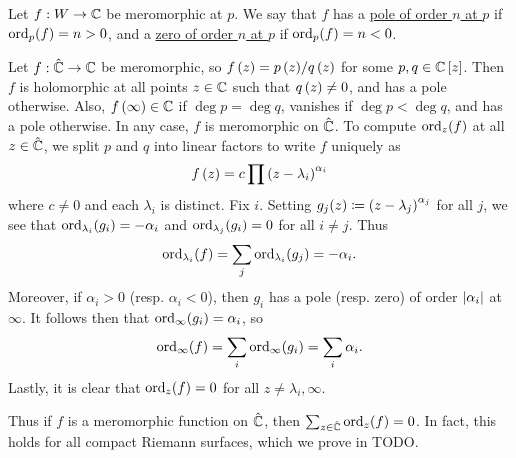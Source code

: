 \documentclass[../Moduli_Spaces_of_Riemann_Surfaces.tex]{subfiles}
\begin{document}
    \begin{definition}
        Let $f:W\to\mathbb{C}$ be meromorphic at $p$. We say that $f$ has a \ul{pole of order $n$ at $p$} if $\operatorname{ord}_p\!\left(f\right)=n>0$, and a \ul{zero of order $n$ at $p$} if $\operatorname{ord}_p\!\left(f\right)=n<0$.
    \end{definition}
    \begin{example}
        Let $f:\hat{\mathbb{C}}\to\mathbb{C}$ be meromorphic, so $f\left(z\right)=p\left(z\right)\!/q\left(z\right)$ for some $p,q\in\mathbb{C}\left[z\right]$. Then $f$ is holomorphic at all points $z\in\mathbb{C}$ such that $q\left(z\right)\neq0$, and has a pole otherwise. Also, $f\left(\infty\right)\in\mathbb{C}$ if $\deg p=\deg q$, vanishes if $\deg p<\deg q$, and has a pole otherwise. In any case, $f$ is meromorphic on $\hat{\mathbb{C}}$. To compute $\operatorname{ord}_z\!\left(f\right)$ at all $z\in\hat{\mathbb{C}}$, we split $p$ and $q$ into linear factors to write $f$ uniquely as
        \begin{equation*}
            f\left(z\right)=c\prod\left(z-\lambda_i\right)^{\alpha_i}
        \end{equation*}
        where $c\neq0$ and each $\lambda_i$ is distinct. Fix $i$. Setting $g_j\!\left(z\right)\coloneqq\left(z-\lambda_j\right)^{\alpha_j}$ for all $j$, we see that $\operatorname{ord}_{\lambda_i}\!\left(g_i\right)=-\alpha_i$ and $\operatorname{ord}_{\lambda_j}\!\left(g_i\right)=0$ for all $i\neq j$. Thus
        \begin{equation*}
            \operatorname{ord}_{\lambda_i}\!\left(f\right)=\sum_j\operatorname{ord}_{\lambda_i}\!\left(g_j\right)=-\alpha_i.
        \end{equation*}
        Moreover, if $\alpha_i>0$ (resp. $\alpha_i<0$), then $g_i$ has a pole (resp. zero) of order $\left|\alpha_i\right|$ at $\infty$. It follows then that $\operatorname{ord}_\infty\!\left(g_i\right)=\alpha_i$, so
        \begin{equation*}
            \operatorname{ord}_\infty\!\left(f\right)=\sum_i\operatorname{ord}_\infty\!\left(g_i\right)=\sum_i\alpha_i.
        \end{equation*}
        Lastly, it is clear that $\operatorname{ord}_z\!\left(f\right)=0$ for all $z\neq \lambda_i,\infty$.\exqed
    \end{example}
    \begin{remark}
        Thus if $f$ is a meromorphic function on $\hat{\mathbb{C}}$, then $\sum_{z\in\hat{\mathbb{C}}}\operatorname{ord}_z\!\left(f\right)=0$. In fact, this holds for all compact Riemann surfaces, which we prove in TODO.\exqed
    \end{remark}
\end{document}
